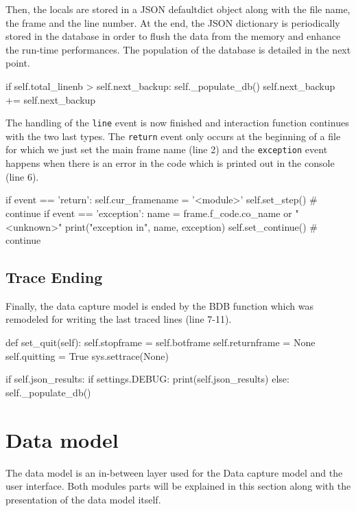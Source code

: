 Then, the locals are stored in a JSON defaultdict object along with the file name, the frame and the line number. At the end, the JSON dictionary is periodically stored in the database in order to flush the data from the memory and enhance the run-time performances. The population of the database is detailed in the next point.

\begin{python}
if self.total_linenb > self.next_backup:
    self._populate_db()
    self.next_backup += self.next_backup
\end{python}

The handling of the \texttt{line} event is now finished and interaction function continues with the two last types. The \texttt{return} event only occurs at the beginning of a file for which we just set the main frame name (line 2) and the \texttt{exception} event happens when there is an error in the code which is printed out in the console (line 6).
\begin{python}
if event == 'return':
    self.cur_framename = '<module>'
    self.set_step()  # continue
if event == 'exception':
    name = frame.f_code.co_name or "<unknown>"
    print("exception in", name, exception)
    self.set_continue()  # continue
\end{python}

\subsection{Trace Ending}

Finally, the data capture model is ended by the  BDB function which was remodeled for writing the last traced lines (line 7-11).
\begin{python}
def set_quit(self):
    self.stopframe = self.botframe
    self.returnframe = None
    self.quitting = True
    sys.settrace(None)

    if self.json_results:
        if settings.DEBUG:
            print(self.json_results)
        else:
            self._populate_db()
\end{python}



\section{Data model}
The data model is an in-between layer used for the Data capture model and the user interface. Both modules parts will be explained in this section along with the presentation of the data model itself.

